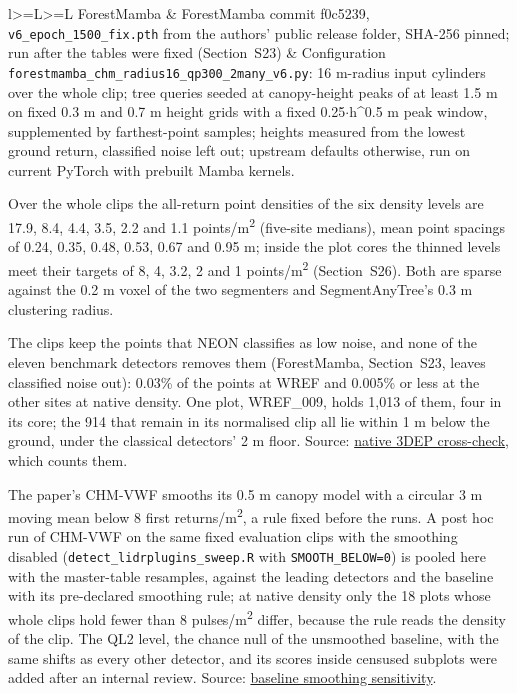 \documentclass[10pt]{article}
\makeatletter
\newcommand\suppFloatBarrier{\par\addpenalty\z@
  \ifx\@deferlist\@empty\else\expandafter\supp@flush\fi}
\newcommand\supp@flush{\let\supp@waiting\@deferlist
  \newpage
  \ifx\@deferlist\supp@waiting\null\newpage\fi
  \ifx\@deferlist\supp@waiting\expandafter\clearpage\else\expandafter\suppFloatBarrier\fi}
\gdef\supp@afterheading{}
\renewcommand\section{\suppFloatBarrier
    \gdef\supp@afterheading{\suppressfloats[t]\gdef\supp@afterheading{}}\supp@section}}
\makeatother
\begin{document}
{\begin{xltabular}{\textwidth}{l>{\hsize\linewidth=\hsize}L>{\hsize\linewidth=\hsize}L}
ForestMamba & ForestMamba commit f0c5239, \texttt{v6\_epoch\_1500\_fix.pth} from the authors' public release folder, SHA-256 pinned; run after the tables were fixed (Section~S23) & Configuration \texttt{forestmamba\_chm\_radius16\_qp300\_2many\_v6.py}: 16 m-radius input cylinders over the whole clip; tree queries seeded at canopy-height peaks of at least 1.5 m on fixed 0.3 m and 0.7 m height grids with a fixed 0.25$\cdot$h\^{}0.5 m peak window, supplemented by farthest-point samples; heights measured from the lowest ground return, classified noise left out; upstream defaults otherwise, run on current PyTorch with prebuilt Mamba kernels. \\
\end{xltabular}
}

Over the whole clips the all-return point densities of the six density levels
are 17.9, 8.4, 4.4, 3.5, 2.2 and 1.1 points/m\textsuperscript{2} (five-site medians), mean point
spacings of 0.24, 0.35, 0.48, 0.53, 0.67 and 0.95 m; inside the plot cores the
thinned levels meet their targets of 8, 4, 3.2, 2 and 1 points/m\textsuperscript{2} (Section~S26).
Both are sparse against the 0.2 m voxel of the two segmenters and
SegmentAnyTree's 0.3 m clustering radius.

The clips keep the points that NEON classifies as low noise, and none of the
eleven benchmark detectors removes them (ForestMamba, Section~S23, leaves
classified noise out): 0.03\% of the points at WREF and 0.005\% or less at the
other sites at native density. One plot, WREF\_009, holds 1,013 of them, four in
its core; the 914 that remain in its normalised clip all lie within 1 m below
the ground, under the classical detectors' 2 m floor. Source: \href{https://github.com/devakellc/lidar-tree-benchmark/blob/main/results/native-ql2-crosscheck-results.md}{native 3DEP
cross-check}, which counts them.

\section*{S16. The Baseline Without Its Smoothing}

The paper's CHM-VWF smooths its 0.5 m canopy model with a circular 3 m moving
mean below 8 first returns/m\textsuperscript{2}, a rule fixed before the runs. A post hoc run of
CHM-VWF on the same fixed evaluation clips with the smoothing disabled
(\texttt{detect\_lidrplugins\_sweep.R} with \texttt{SMOOTH\_BELOW=0}) is pooled here with the
master-table resamples, against the leading detectors and the baseline with its
pre-declared smoothing rule; at native density only the 18 plots whose whole
clips hold fewer than 8 pulses/m\textsuperscript{2} differ, because the rule reads the density of
the clip. The QL2 level, the chance null of the unsmoothed baseline, with the
same shifts as every other detector, and its scores inside censused subplots
were added after an internal review. Source: \href{https://github.com/devakellc/lidar-tree-benchmark/blob/main/results/baseline-smoothing-sensitivity-results.md}{baseline smoothing
sensitivity}.
\end{document}
